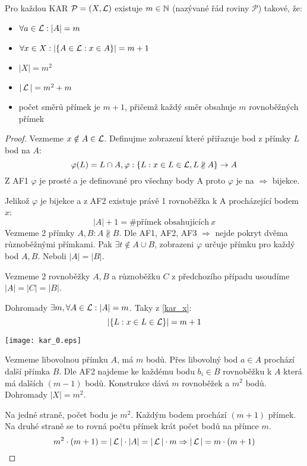 \begin{theorem}
    Pro každou KAR $\mathcal{P}=(X,\operatorname{\mathcal{L}})$ existuje $m\in\operatorname{\mathbb{N}}$ (nazývané řád roviny $\mathcal{P}$) takové, že:
    \begin{itemize}
        \item $\forall a\in\operatorname{\mathcal{L}}: |A| = m$
        \item $\forall x\in X: |\{A\in\operatorname{\mathcal{L}}: x\in A\}|=m+1$
        \item $|X|=m^2$
        \item $|\operatorname{\mathcal{L}}| = m^2+m$
        \item počet směrů přímek je $m+1$, přičemž každý směr obsahuje $m$ rovnoběžných přímek
    \end{itemize}
\end{theorem}
\begin{proof}
	Vezmeme $x \notin A \in \operatorname{\mathcal{L}}$.
	Definujme zobrazení které přiřazuje bod z přímky $L$ bod na $A$:
	\[ \varphi(L) = L \cap A, \varphi:\{ L: x \in L \in \operatorname{\mathcal{L}}, L \nparallel A \} \to A \]
	Z AF1 $\varphi$ je prosté a je definované pro všechny body A proto $\varphi$ je na $\Rightarrow$ bijekce.

	Jelikož $\varphi$ je bijekce a z AF2 existuje právě 1 rovnoběžka k A procházející bodem $x$:
	\begin{equation}\label{kar_x}
		|A| + 1 = \text{\# přímek obsahujících}\ x
	\end{equation}
	Vezmeme 2 přímky $A, B: A \nparallel B$. Dle AF1, AF2, AF3 $\Rightarrow$ nejde pokryt dvěma různoběžnými přímkami.
	Pak $\exists t \notin A \cup B$, zobrazeni $\varphi$ určuje přímku pro každý bod $A, B$.
	Neboli $|A| = |B|$.

	Vezmeme 2 rovnoběžky $A, B$ a různoběžku $C$ z předchozího případu usoudíme $|A| = |C| = |B|$.

	Dohromady $\exists m, \forall A \in \operatorname{\mathcal{L}}: |A| = m$.
	Taky z \eqref{kar_x}:
	\[ | \{L : x \in L \in \operatorname{\mathcal{L}}\} | = m + 1 \]

	\texttt{[image: kar\_0.eps]}

	Vezmeme libovolnou přímku $A$, má $m$ bodů. Přes libovolný bod $a \in A$ prochází další přímka $B$.
	Dle AF2 najdeme ke každému bodu $b_i \in B$ rovnoběžku k $A$ která má dalších $(m - 1)$ bodů.
	Konstrukce dává $m$ rovnoběžek a $m^2$ bodů.
	Dohromady $|X| = m^2$.

	Na jedné straně, počet bodu je $m^2$. Každým bodem prochází $(m + 1)$ přímek.
	Na druhé straně se to rovná počtu přímek krát počet bodů na přímce $m$.
	\[ m^2 \cdot (m + 1) = |\operatorname{\mathcal{L}}| \cdot |A| = |\operatorname{\mathcal{L}}| \cdot m \Rightarrow |\operatorname{\mathcal{L}}| = m \cdot (m + 1) \]
\end{proof}
